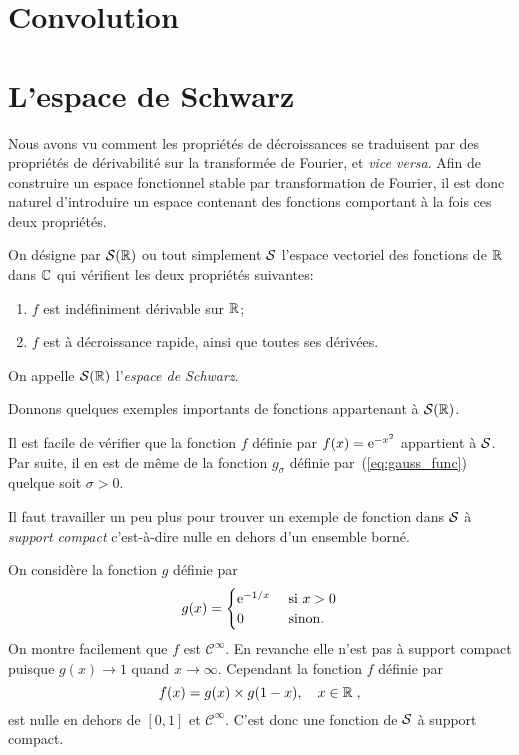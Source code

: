 \section{Convolution}

\section{L'espace de Schwarz}

Nous avons vu comment les propri{\'e}t{\'e}s de d{\'e}croissances se traduisent par des
propri{\'e}t{\'e}s de d{\'e}rivabilit{\'e} sur la transform{\'e}e de Fourier, et \textit{vice
  versa}.
Afin de construire un espace fonctionnel stable par transformation de Fourier,
il est donc naturel d'introduire un espace contenant des fonctions comportant
{\`a} la fois ces deux propri{\'e}t{\'e}s.

\begin{definition} On d{\'e}signe par $\mathcal{S}(\mathbb{R})$ ou tout simplement $\mathcal{S}$
l'espace vectoriel des fonctions de $\mathbb{R}$ dans $\mathbb{C}$ qui v{\'e}rifient les deux propri{\'e}t{\'e}s suivantes:
\begin{enumerate}
\item $f$ est ind{\'e}finiment d{\'e}rivable sur $\mathbb{R}$;
\item $f$ est {\`a} d{\'e}croissance rapide, ainsi que toutes ses d{\'e}riv{\'e}es.
\end{enumerate}
On appelle $\mathcal{S}(\mathbb{R})$ l'\emph{espace de Schwarz}.
\end{definition}

Donnons quelques exemples importants de fonctions appartenant {\`a} $\mathcal{S}(\mathbb{R})$.
\begin{example}
  Il est facile de v{\'e}rifier que la fonction $f$ d{\'e}finie par $f(x)=\mathrm{e}^{-x^2}$
  appartient {\`a} $\mathcal{S}$. Par suite, il en est de m{\^e}me de la fonction $g_\sigma$
  d{\'e}finie par~(\ref{eq:gauss_func}) quelque soit $\sigma>0$.
\end{example}
Il faut travailler un peu plus pour trouver un exemple de fonction dans $\mathcal{S}$
{\`a} \emph{support compact} c'est-{\`a}-dire nulle en dehors d'un ensemble
born{\'e}.
\begin{example}\label{exple:cinfty-supp-compact}
  On consid{\`e}re la fonction $g$ d{\'e}finie par
$$
g(x)=
\begin{cases}
\mathrm{e}^{-1/x} &\text{ si $x>0$}\\
0 &\text{ sinon.}
\end{cases}
$$
On montre facilement que $f$ est
$\mathcal{C}^\infty$. En revanche elle n'est pas {\`a} support compact puisque
$g(x)\to1$ quand $x\to\infty$. Cependant la fonction $f$ d{\'e}finie par
$$
f(x)=g(x) \times g(1-x) ,\quad x\in\mathbb{R}\;,
$$
est nulle en dehors de $[0,1]$ et $\mathcal{C}^\infty$. C'est donc une fonction
de $\mathcal{S}$ {\`a} support compact.
\end{example}

